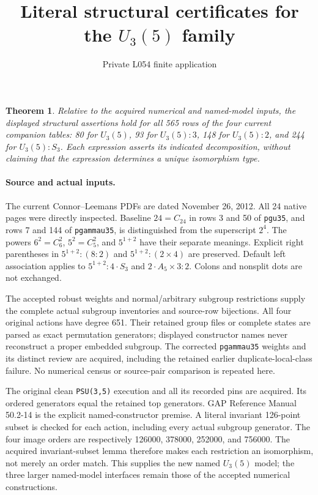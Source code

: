 \documentclass[11pt]{article}
\title{Literal structural certificates for the $U_3(5)$ family}
\author{Private L054 finite application}\date{}
\newtheorem{theorem}{Theorem}
\begin{document}
\maketitle
\begin{theorem}
Relative to the acquired numerical and named-model inputs, the displayed
structural assertions hold for all 565 rows of the four current companion
tables: 80 for $U_3(5)$, 93 for $U_3(5):3$, 148 for $U_3(5):2$, and
244 for $U_3(5):S_3$. Each expression asserts its indicated decomposition,
without claiming that the expression determines a unique isomorphism type.
\end{theorem}
\paragraph{Source and actual inputs.}
The current Connor--Leemans PDFs are dated November 26, 2012. All 24 native
pages were directly inspected. Baseline $24=C_{24}$ in rows 3 and 50 of
\texttt{pgu35}, and rows 7 and 144 of \texttt{pgammau35}, is distinguished
from the superscript $2^4$. The powers $6^2=C_6^2$, $5^2=C_5^2$, and
$5^{1+2}$ have their separate meanings. Explicit right parentheses in
$5^{1+2}:(8:2)$ and $5^{1+2}:(2\times4)$ are preserved. Default left
association applies to $5^{1+2}:4\mathbin{\cdot}S_3$ and
$2\mathbin{\cdot}A_5\times3:2$. Colons and nonsplit dots are not exchanged.

The accepted robust weights and normal/arbitrary subgroup restrictions
supply the complete actual subgroup inventories and source-row bijections.
All four original actions have degree 651. Their retained group files or
complete states are parsed as exact permutation generators; displayed
constructor names never reconstruct a proper embedded subgroup. The
corrected \texttt{pgammau35} weights and its distinct review are acquired,
including the retained earlier duplicate-local-class failure. No numerical
census or source-pair comparison is repeated here.

The original clean \texttt{PSU(3,5)} execution and all its recorded pins are
acquired. Its ordered generators equal the retained top generators.
GAP Reference Manual 50.2-14 is the explicit named-constructor premise.
A literal invariant 126-point subset is checked for each action, including
every actual subgroup generator. The four image orders are respectively
126000, 378000, 252000, and 756000. The acquired invariant-subset lemma
therefore makes each restriction an isomorphism, not merely an order match.
This supplies the new named $U_3(5)$ model; the three larger named-model
interfaces remain those of the accepted numerical constructions.
\end{document}

